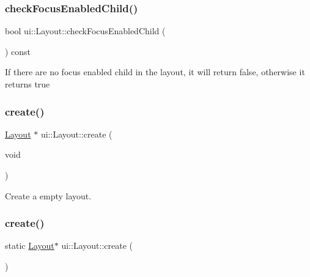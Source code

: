 \subsubsection{\texorpdfstring{check\+Focus\+Enabled\+Child()}{checkFocusEnabledChild()}\hspace{0.1cm}{\footnotesize\ttfamily [2/2]}}
{\footnotesize\ttfamily bool ui\+::\+Layout\+::check\+Focus\+Enabled\+Child (\begin{DoxyParamCaption}{ }\end{DoxyParamCaption}) const\hspace{0.3cm}{\ttfamily [protected]}}

If there are no focus enabled child in the layout, it will return false, otherwise it returns true \mbox{\label{classui_1_1Layout_a1a54041ae0a3da6ed2f538c1046ec9da}} 
\subsubsection{\texorpdfstring{create()}{create()}\hspace{0.1cm}{\footnotesize\ttfamily [1/2]}}
{\footnotesize\ttfamily \hyperlink{classui_1_1Layout}{Layout} $\ast$ ui\+::\+Layout\+::create (\begin{DoxyParamCaption}\item[{void}]{ }\end{DoxyParamCaption})\hspace{0.3cm}{\ttfamily [static]}}

Create a empty layout. \mbox{\label{classui_1_1Layout_a57baf63a0209d87f9ab46b18b6655ec9}} 
\subsubsection{\texorpdfstring{create()}{create()}\hspace{0.1cm}{\footnotesize\ttfamily [2/2]}}
{\footnotesize\ttfamily static \hyperlink{classui_1_1Layout}{Layout}$\ast$ ui\+::\+Layout\+::create (\begin{DoxyParamCaption}{ }\end{DoxyParamCaption})\hspace{0.3cm}{\ttfamily [static]}}

